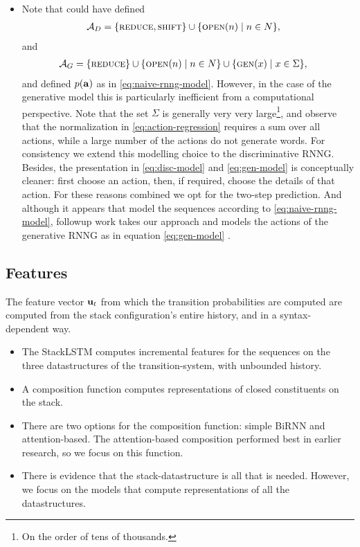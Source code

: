 \begin{itemize}
  \item Note that could have defined
  \begin{align*}
    \mathcal{A}_D &= \{ \textsc{reduce}, \textsc{shift} \} \cup \{ \textsc{open}(n) \mid n \in N \},
  \end{align*}
  and
  \begin{align*}
    \mathcal{A}_G &= \{ \textsc{reduce} \} \cup \{ \textsc{open}(n) \mid n \in N \} \cup \{ \textsc{gen}(x) \mid x \in \Sigma \},
  \end{align*}
  and defined $p(\mathbf{a})$ as in \ref{eq:naive-rnng-model}. However, in the case of the generative model this is particularly inefficient from a computational perspective. Note that the set $\Sigma$ is generally very very large\footnote{On the order of tens of thousands.}, and observe that the normalization in \ref{eq:action-regression} requires a sum over all actions, while a large number of the actions do not generate words. For consistency we extend this modelling choice to the discriminative RNNG. Besides, the presentation in \ref{eq:disc-model} and \ref{eq:gen-model} is conceptually cleaner: first choose an action, then, if required, choose the details of that action. For these reasons combined we opt for the two-step prediction. And although it appears that \citet{dyer2016rnng} model the sequences according to \ref{eq:naive-rnng-model}, followup work takes our approach and models the actions of the generative RNNG as in equation \ref{eq:gen-model} \citep{hale2018beam}.

\end{itemize}

\subsection{Features}
The feature vector $\mathbf{u}_t$ from which the transition probabilities are computed are computed from the stack configuration's entire history, and in a syntax-dependent way.
\begin{itemize}
  \item The StackLSTM computes incremental features for the sequences on the three datastructures of the transition-system, with unbounded history.
  \item A composition function computes representations of closed constituents on the stack.
  \item There are two options for the composition function: simple BiRNN and attention-based. The attention-based composition performed best in earlier research, so we focus on this function.
  \item There is evidence that the stack-datastructure is all that is needed. However, we focus on the models that compute representations of all the datastructures.
\end{itemize}

